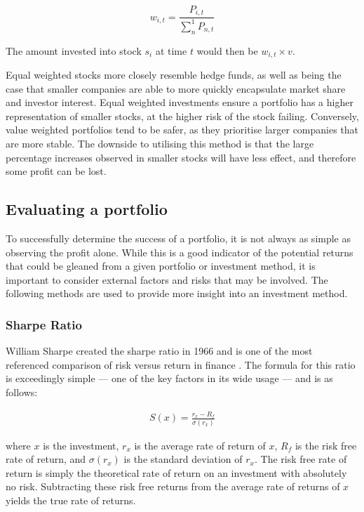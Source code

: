 \begin{equation}
w_{i,t} = \frac{P_{i,t}}{\sum_{n}^1 P_{n,t}}
\end{equation}

\noindent
The amount invested into stock $s_i$ at time $t$ would then be $w_{i,t} \times v$.

Equal weighted stocks more closely resemble hedge funds, as well as being the case that smaller companies are able to more quickly encapsulate market share and investor interest. Equal weighted investments ensure a portfolio has a higher representation of smaller stocks, at the higher risk of the stock failing. Conversely, value weighted portfolios tend to be safer, as they prioritise larger companies that are more stable. The downside to utilising this method is that the large percentage increases observed in smaller stocks will have less effect, and therefore some profit can be lost.

\subsection{Evaluating a portfolio}
To successfully determine the success of a portfolio, it is not always as simple as observing the profit alone. While this is a good indicator of the potential returns that could be gleaned from a given portfolio or investment method, it is important to consider external factors and risks that may be involved. The following methods are used to provide more insight into an investment method.

\subsubsection{Sharpe Ratio}
William Sharpe created the sharpe ratio in 1966 and is one of the most referenced comparison of risk versus return in finance \cite{sharpe-ratio}. The formula for this ratio is exceedingly simple --- one of the key factors in its wide usage --- and is as follows:

\begin{align*}
S(x) = \frac{r_x - R_f}{\sigma(r_x)}
\end{align*}

\noindent
where $x$ is the investment, $r_x$ is the average rate of return of $x$, $R_f$ is the risk free rate of return, and $\sigma(r_x)$ is the standard deviation of $r_x$. The risk free rate of return is simply the theoretical rate of return on an investment with absolutely no risk. Subtracting these risk free returns from the average rate of returns of $x$ yields the true rate of returns.

